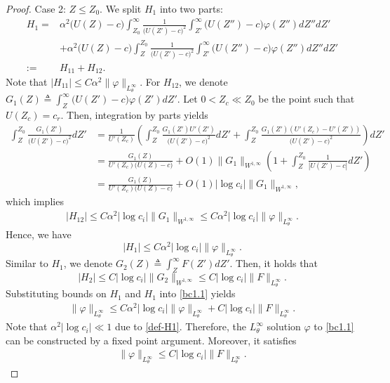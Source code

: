 \documentclass[reqno,11pt]{amsart}
\numberwithin{equation}{section}
\numberwithin{equation}{section}
\theoremstyle{plain}
\begin{document}
\begin{proof}
	Case 2: $Z\leq Z_0$. We split $H_1$ into two parts:
	$$
	\begin{aligned}
		H_1=&\alpha^2\big(U(Z)-c\big)\int_{Z_0}^\infty \frac{1}{\big(U(Z')-c\big)^2} \int_{Z'}^\infty \big(U(Z'')-c\big)\varphi(Z'')dZ''dZ'\\
		&+\alpha^2\big(U(Z)-c\big)\int_Z^{Z_0}\frac{1}{\big(U(Z')-c\big)^2} \int_{Z'}^\infty \big(U(Z'')-c\big)\varphi(Z'')dZ''dZ'\\
		:=&H_{11}+H_{12}.
	\end{aligned}
	$$
	Note that $|H_{11}|\leq C\alpha^2 \|\varphi\|_{L^\infty_{\theta}}$. For $H_{12}$, we denote $G_1(Z)\triangleq\int_{Z}^\infty\big(U(Z')-c\big)\varphi(Z')d Z'.$ Let $0<Z_c\ll Z_0$ be the point such that $U(Z_c)=c_r.$ Then,
	integration by parts yields
	\begin{align}
		\int_{Z}^{Z_0}\frac{G_1(Z')}{\big(U(Z')-c\big)^2}d Z'&=\frac{1}{U'(Z_c)}\left(\int_Z^{Z_0}\frac{G_1(Z')U'(Z')}{\big(U(Z')-c\big)^2} dZ'+\int_{Z}^{Z_0}\frac{G_1(Z')(U'(Z_c)-U'(Z'))}{\big(U(Z')-c\big)^2}\right)d Z'\nonumber\\
		&=\frac{G_1(Z)}{U'(Z_c)\big(U(Z)-c\big)}+O(1)\|G_1\|_{W^{1,\infty}}\left(1+\int_Z^{Z_0}\frac{1}{|U(Z')-c|}d Z'\right)\nonumber\\
		&=\frac{G_1(Z)}{U'(Z_c)\big(U(Z)-c\big)}+O(1)|\log c_i|\|G_1\|_{W^{1,\infty}},\label{g}
	\end{align}
which implies
	\begin{align}
		|H_{12}|\leq C \alpha^2 |\log c_i| \|G_1\|_{W^{1,\infty}}\leq C\alpha^2|\log c_i|\|\varphi\|_{L^\infty_{\theta}}.\nonumber
	\end{align}
Hence, we have $$|H_1|\leq C\alpha^2|\log c_i|\|\varphi\|_{L^\infty_{\theta}}.$$ Similar to $H_1$, we denote $G_2(Z)\triangleq\int_Z^\infty F(Z')d Z'$. Then, it holds that 
	$$|H_2|\leq C|\log c_i|\|G_2\|_{W^{1,\infty}}\leq C|\log c_i|\|F\|_{L^\infty_{\theta}}.
	$$
	Substituting bounds on $H_1$ and $H_1$ into \eqref{bc1.1} yields 
	\begin{align}
		\|\varphi\|_{L^\infty_\theta}\leq C\alpha^2|\log c_i|\|\varphi\|_{L^\infty_{\theta}}+C|\log c_i|\|F\|_{L^\infty_{\theta}}.\nonumber
	\end{align}
Note that $\alpha^2|\log c_i|\ll 1$ due to \eqref{def-H1}. Therefore, the $L^\infty_{\theta}$ solution $\varphi$ to \eqref{bc1.1} can be constructed by a fixed point argument. Moreover, it satisfies 
	\begin{align}
		\|\varphi\|_{L^\infty_\theta}\leq C|\log c_i|\|F\|_{L^\infty_{\theta}}.\label{bc1.2}
	\end{align}
	

\end{proof}
\end{document}

